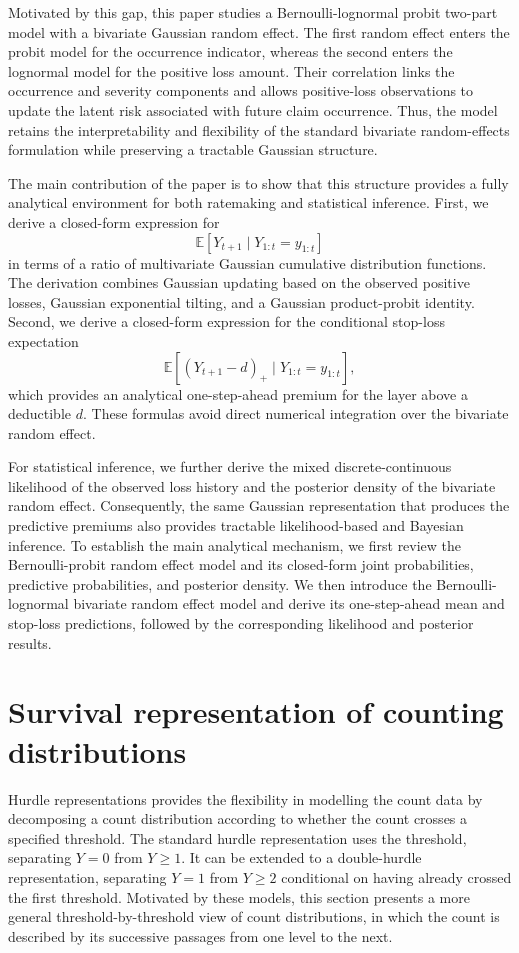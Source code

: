 \documentclass[11pt,authoryear]{elsarticle}
\def\E#1{{\mathbb E}\left[#1\right]}
\theoremstyle{nopunct}
\numberwithin{equation}{section}
\begin{document}
Motivated by this gap, this paper studies a Bernoulli-lognormal probit
two-part model with a bivariate Gaussian random effect. The first random
effect enters the probit model for the occurrence indicator, whereas the
second enters the lognormal model for the positive loss amount. Their
correlation links the occurrence and severity components and allows
positive-loss observations to update the latent risk associated with
future claim occurrence. Thus, the model retains the interpretability
and flexibility of the standard bivariate random-effects formulation
while preserving a tractable Gaussian structure.

The main contribution of the paper is to show that this structure
provides a fully analytical environment for both ratemaking and
statistical inference. First, we derive a closed-form expression for
\[
\E{Y_{t+1}\mid Y_{1:t}=y_{1:t}}
\]
in terms of a ratio of multivariate Gaussian cumulative distribution
functions. The derivation combines Gaussian updating based on the
observed positive losses, Gaussian exponential tilting, and a
Gaussian product-probit identity. Second, we derive a closed-form
expression for the conditional stop-loss expectation
\[
\E{(Y_{t+1}-d)_+\mid Y_{1:t}=y_{1:t}},
\]
which provides an analytical one-step-ahead premium for the layer above
a deductible \(d\). These formulas avoid direct numerical integration
over the bivariate random effect.

For statistical inference, we further derive the mixed
discrete-continuous likelihood of the observed loss history and the
posterior density of the bivariate random effect. Consequently, the same
Gaussian representation that produces the predictive premiums also
provides tractable likelihood-based and Bayesian inference. To establish
the main analytical mechanism, we first review the Bernoulli-probit
random effect model and its closed-form joint probabilities, predictive
probabilities, and posterior density. We then introduce the
Bernoulli-lognormal bivariate random effect model and derive its
one-step-ahead mean and stop-loss predictions, followed by the
corresponding likelihood and posterior results.

\section{Survival representation of counting distributions}
\label{sec.3}
Hurdle representations provides the flexibility in modelling the count data by decomposing a
count distribution according to whether the count crosses a specified
threshold. The standard hurdle representation uses the threshold,
separating \(Y=0\) from \(Y\ge1\). It can be extended to a double-hurdle representation, separating \(Y=1\) from \(Y\ge2\) conditional on
having already crossed the first threshold. Motivated by these models, this section presents a more
general threshold-by-threshold view of count distributions, in which the count
is described by its successive passages from one level to the next. 
\end{document}
